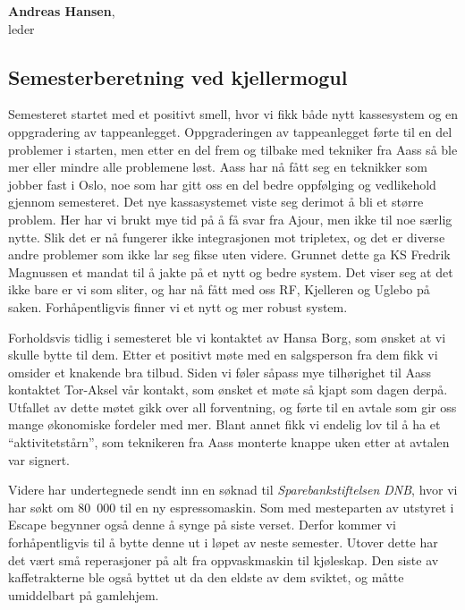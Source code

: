 \documentclass[10pt,norsk,a4paper]{article}
\begin{document}
\textbf{Andreas Hansen},\\
leder \\
\date{25.\ april 2018}
\newpage


\subsection{Semesterberetning ved kjellermogul}

\begin{multicols}{2}
Semesteret startet med et positivt smell, hvor vi fikk både nytt kassesystem og en oppgradering av
tappeanlegget. Oppgraderingen av tappeanlegget førte til en del problemer i starten, men etter en del frem og tilbake med tekniker fra Aass så ble mer eller mindre alle problemene løst. Aass har nå fått seg en teknikker som jobber fast i Oslo, noe som har gitt oss en del bedre oppfølging og vedlikehold gjennom semesteret. Det nye kassasystemet viste seg derimot å bli et større problem. Her har vi brukt mye tid på å få svar fra Ajour, men ikke til noe særlig nytte. Slik det er nå fungerer ikke integrasjonen mot tripletex, og det er diverse andre problemer som ikke lar seg fikse uten videre. Grunnet dette ga KS Fredrik Magnussen et mandat til å jakte på et nytt og bedre system. Det viser seg at det ikke bare er vi som sliter, og har nå fått med oss RF, Kjelleren og Uglebo på saken. Forhåpentligvis finner vi et nytt og mer robust system.

Forholdsvis tidlig i semesteret ble vi kontaktet av Hansa Borg, som ønsket at vi skulle bytte til dem. Etter
et positivt møte med en salgsperson fra dem fikk vi omsider et knakende bra tilbud. Siden vi føler såpass
mye tilhørighet til Aass kontaktet Tor-Aksel vår kontakt, som ønsket et møte så kjapt som dagen derpå. Utfallet av dette møtet gikk over all forventning, og førte til en avtale som gir oss mange økonomiske fordeler med mer. Blant annet fikk vi endelig lov til å ha et “aktivitetstårn”, som teknikeren fra Aass monterte knappe uken etter at avtalen var signert.

Videre har undertegnede sendt inn en søknad til \textit{Sparebankstiftelsen DNB}, hvor vi har søkt om 80~000
til en ny espressomaskin. Som med mesteparten av utstyret i Escape begynner også denne å synge på siste
verset. Derfor kommer vi forhåpentligvis til å bytte denne ut i løpet av neste semester. Utover dette har
det vært små reperasjoner på alt fra oppvaskmaskin til kjøleskap. Den siste av kaffetrakterne ble også
byttet ut da den eldste av dem sviktet, og måtte umiddelbart på gamlehjem.


\end{multicols}
\end{document}
